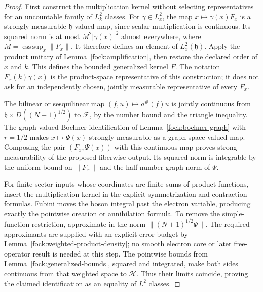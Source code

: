 \documentclass[11pt,a4paper]{article}
\theoremstyle{definition}
\theoremstyle{remark}
\begin{document}
\begin{proof}
First construct the multiplication kernel without selecting
representatives for an uncountable family of $L^2_k$ classes.
For $\gamma\in L^2_x$, the map $x\mapsto\gamma(x)F_x$ is a
strongly measurable $\mathfrak h$-valued map, since scalar
multiplication is continuous. Its squared norm is at most
$M^2|\gamma(x)|^2$ almost everywhere, where
$M=\operatorname*{ess\,sup}_x\|F_x\|$. It therefore defines an
element of $L^2_x(\mathfrak h)$. Apply the product unitary of
Lemma~\ref{fock:amplification}, then restore the declared order
of $x$ and $k$. This defines the bounded generalized kernel $F$.
The notation $F_x(k)\gamma(x)$ is the product-space representative
of this construction; it does not ask for an independently chosen,
jointly measurable representative of every $F_x$.

The bilinear or sesquilinear map $(f,u)\mapsto a^{\#}(f)u$
is jointly continuous from
$\mathfrak h\times D((N+1)^{1/2})$ to $\mathcal F$, by the
number bound and the triangle inequality. The graph-valued Bochner
identification of Lemma~\ref{fock:bochner-graph} with $r=1/2$
makes $x\mapsto\Psi(x)$ strongly
measurable as a graph-space-valued map. Composing the pair
$(F_x,\Psi(x))$ with this continuous map proves strong
measurability of the proposed fiberwise output. Its squared norm is
integrable by the uniform bound on $\|F_x\|$ and the half-number
graph norm of $\Psi$.

For finite-sector inputs whose coordinates are finite sums of product
functions, insert the multiplication kernel in the explicit
symmetrization and contraction formulas. Fubini moves the boson
integral past the electron variable, producing exactly the pointwise
creation or annihilation formula. To remove the simple-function
restriction, approximate in the norm $\|(N+1)^{1/2}\Psi\|$.
The required approximants are supplied with an explicit error
budget by Lemma~\ref{fock:weighted-product-density}; no smooth
electron core or later free-operator result is needed at this step.
The pointwise bounds from Lemma~\ref{fock:generalized-bounds}, squared
and integrated, make both sides continuous from that weighted space
to $\mathcal H$. Thus their limits coincide, proving the claimed
identification as an equality of $L^2$ classes.
\end{proof}
\end{document}
